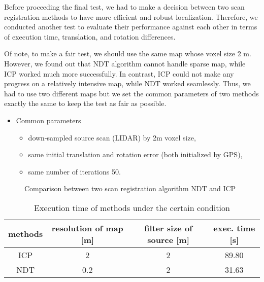\par Before proceeding the final test, we had to make a decision between two scan registration methods to have more efficient and robust localization. Therefore, we conducted another test to evaluate their performance against each other in terms of execution time, translation, and rotation differences.\\ 
\par Of note, to make a fair test, we should use the same map whose voxel size 2 m. However, we found out that NDT algorithm cannot handle sparse map, while ICP worked much more successfully. In contrast, ICP could not make any progress on a relatively intensive map, while NDT worked seamlessly. Thus, we had to use two different maps but we set the common parameters of two methods exactly the same to keep the test as fair as possible.
\begin{itemize}
\item Common parameters
\begin{itemize}
    \item down-sampled source scan (LIDAR) by 2m voxel size,
    \item same initial translation and rotation error (both initialized by GPS),
    \item same number of iterations 50.
\end{itemize}
\end{itemize}

\begin{figure}[H]
\centering
{}
\end{figure}
\vspace{-0.5cm}
\begin{figure}[H]
\centering
{}
\caption{Comparison between two scan registration algorithm NDT and ICP}
\label{fig:icp_vs_ndt}
\end{figure}
\begin{table}[H]
    \centering
    \small
    \begin{tabular}{|c|c|c|c|}
    \hline
         methods &resolution of map [m]&filter size of source [m]&exec. time [s]\\ 
         \hline
         ICP& 2& 2 & 89.80\\
         \hline
         NDT& 0.2 & 2 & 31.63\\
         \hline
    \end{tabular}
    \caption{Execution time of methods under the certain condition}
    \label{tab:compare_ekf_ndt}
\end{table}

